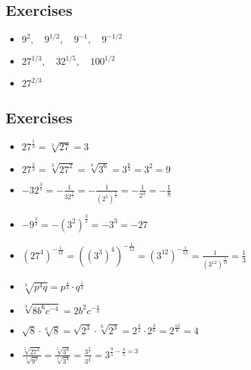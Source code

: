 \documentclass{hw}
\begin{document}
\subsection*{\normalsize Exercises}
\begin{itemize}
\item $9^2, \quad 9^{1/2}, \quad 9^{-1}, \quad 9^{-1/2}$
\item $27^{1/3}, \quad 32^{1/5}, \quad 100^{1/2}$
\item $27^{2/3}$
\end{itemize}

\subsection*{\normalsize Exercises}
\begin{itemize}
    \item $27^\frac{1}{3} = \sqrt[3]{27} = 3$
    \item $27^\frac{2}{3} = \sqrt[3]{27^2} = \sqrt[3]{3^6} = 3^\frac{6}{3} = 3^2 = 9$
    \item $-32^\frac{3}{5} = -\frac{1}{32^\frac{3}{5}} = -\frac{1}{(2^{5})^\frac{3}{5}} = -\frac{1}{2^3} = -\frac{1}{8}$
    \item $-9^\frac{3}{2} = -(3^2)^\frac{3}{2} = -3^3 = -27$
    \item $(27^4)^{-\frac{1}{12}} = ((3^3)^4)^{-\frac{1}{12}} = (3^{12})^{-\frac{1}{12}} = \frac{1}{(3^{12})^{\frac{1}{12}}} = \frac{1}{3}$
    \item $\sqrt[3]{p^4q} = p^\frac{4}{3} \cdot q^\frac{1}{3}$
    \item $\sqrt[3]{8b^6c^{-4}} = 2b^{2}c^{-\frac{4}{3}}$
    \item $\sqrt{8} \cdot \sqrt[6]{8} = \sqrt{2^3} \cdot \sqrt[6]{2^3} = 2^\frac{3}{2} \cdot 2^\frac{3}{6} = 2^\frac{12}{6} = 4$
    \item $\frac{\sqrt[5]{27^3}}{\sqrt[5]{9^2}} = \frac{\sqrt[5]{3^9}}{\sqrt[5]{3^4}} = \frac{3^\frac{9}{5}}{3^\frac{4}{5}} = 3^{\frac{9}{5} - \frac{4}{5} = 3}$
\end{itemize}
\end{document}
